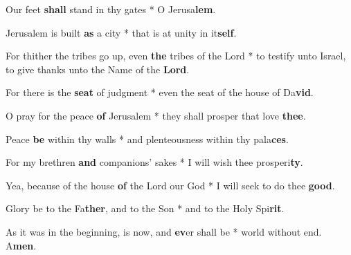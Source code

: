 \begin{multicols}{2}
	Our feet \textbf{shall} stand in thy gates * O Jerusa\textbf{lem}.
	
	Jerusalem is built \textbf{as} a city * that is at unity in it\textbf{self}.
	
	For thither the tribes go up, even \textbf{the} tribes of the Lord * to testify unto Israel, to give thanks unto the Name of the \textbf{Lord}.
	
	For there is the \textbf{seat} of judgment * even the seat of the house of Da\textbf{vid}.
	
	O pray for the peace \textbf{of} Jerusalem * they shall prosper that love \textbf{thee}.
	
	Peace \textbf{be} within thy walls * and plenteousness within thy pala\textbf{ces}.
	
	For my brethren \textbf{and} companions' sakes * I will wish thee prosperi\textbf{ty}.
	
	Yea, because of the house \textbf{of} the Lord our God * I will seek to do thee \textbf{good}.
	
	Glory be to the Fa\textbf{ther}, and to the Son * and to the Holy Spi\textbf{rit}.
	
	As it was in the beginning, is now, and \textbf{ev}er shall be * world without end. A\textbf{men}.
\end{multicols}